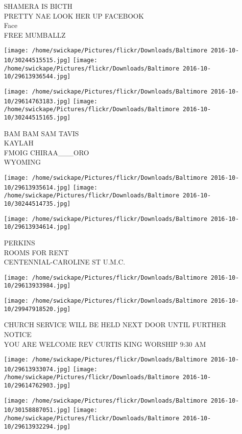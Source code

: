 \documentclass[10pt,letterpaper]{article}
\begin{document}
SHAMERA IS BICTH\\
PRETTY NAE LOOK HER UP FACEBOOK\\
Face\\
FREE MUMBALLZ
\pagebreak

\texttt{[image: /home/swickape/Pictures/flickr/Downloads/Baltimore 2016-10-10/30244515515.jpg]}
\texttt{[image: /home/swickape/Pictures/flickr/Downloads/Baltimore 2016-10-10/29613936544.jpg]}

\texttt{[image: /home/swickape/Pictures/flickr/Downloads/Baltimore 2016-10-10/29614763183.jpg]}
\texttt{[image: /home/swickape/Pictures/flickr/Downloads/Baltimore 2016-10-10/30244515165.jpg]}

BAM BAM SAM TAVIS\\
KAYLAH\\
FMOIG CHIRAA\_\_\_ORO\\
WYOMING
\pagebreak

\texttt{[image: /home/swickape/Pictures/flickr/Downloads/Baltimore 2016-10-10/29613935614.jpg]}
\texttt{[image: /home/swickape/Pictures/flickr/Downloads/Baltimore 2016-10-10/30244514735.jpg]}

\vspace{0.25in}
\texttt{[image: /home/swickape/Pictures/flickr/Downloads/Baltimore 2016-10-10/29613934614.jpg]}

PERKINS\\
ROOMS FOR RENT\\
CENTENNIAL{-}CAROLINE ST U.M.C.
\pagebreak

\texttt{[image: /home/swickape/Pictures/flickr/Downloads/Baltimore 2016-10-10/29613933984.jpg]}

\vspace{0.25in}
\texttt{[image: /home/swickape/Pictures/flickr/Downloads/Baltimore 2016-10-10/29947918520.jpg]}

CHURCH SERVICE WILL BE HELD NEXT DOOR UNTIL FURTHER NOTICE\\
YOU ARE WELCOME REV CURTIS KING WORSHIP 9:30 AM
\pagebreak

\texttt{[image: /home/swickape/Pictures/flickr/Downloads/Baltimore 2016-10-10/29613933074.jpg]}
\texttt{[image: /home/swickape/Pictures/flickr/Downloads/Baltimore 2016-10-10/29614762903.jpg]}

\texttt{[image: /home/swickape/Pictures/flickr/Downloads/Baltimore 2016-10-10/30158887051.jpg]}
\texttt{[image: /home/swickape/Pictures/flickr/Downloads/Baltimore 2016-10-10/29613932294.jpg]}
\end{document}
